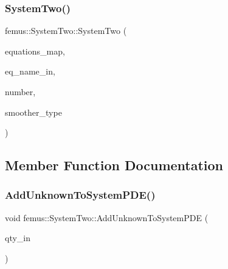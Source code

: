 \subsubsection{\texorpdfstring{System\+Two()}{SystemTwo()}}
{\footnotesize\ttfamily femus\+::\+System\+Two\+::\+System\+Two (\begin{DoxyParamCaption}\item[{\mbox{\hyperlink{classfemus_1_1_multi_level_problem}{Multi\+Level\+Problem}} \&}]{equations\+\_\+map,  }\item[{const std\+::string \&}]{eq\+\_\+name\+\_\+in,  }\item[{const unsigned int}]{number,  }\item[{const \mbox{\hyperlink{_mg_smoother_enum_8hpp_a4d11c2ff93e2f0f440c879a9c40cda71}{Mg\+Smoother}} \&}]{smoother\+\_\+type }\end{DoxyParamCaption})}



\subsection{Member Function Documentation}
\mbox{\label{classfemus_1_1_system_two_a34293cf806f9758e32d6bbbd232088b2}} 
\subsubsection{\texorpdfstring{Add\+Unknown\+To\+System\+P\+D\+E()}{AddUnknownToSystemPDE()}}
{\footnotesize\ttfamily void femus\+::\+System\+Two\+::\+Add\+Unknown\+To\+System\+P\+DE (\begin{DoxyParamCaption}\item[{\mbox{\hyperlink{classfemus_1_1_quantity}{Quantity}} $\ast$}]{qty\+\_\+in }\end{DoxyParamCaption})\hspace{0.3cm}{\ttfamily [inline]}}

\mbox{\label{classfemus_1_1_system_two_aaadd0133fb394bd3938a76d8d1888883}} 
